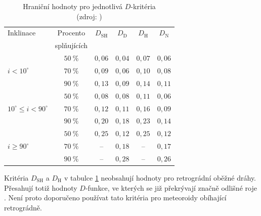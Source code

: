 \begin{table}[ht]
    \centering
    \caption[Hraniční hodnoty pro jednotlivá $D$-kritéria]{
        Hraniční hodnoty pro jednotlivá $D$-kritéria\\
        {\small (zdroj: \cite{galligan})}
    }
    \begin{tabular}{|l|c|c c c c|}
        \hline
        Inklinace                   & Procento    & $D_\text{SH}$ & $D_\text{D}$ & $D_\text{H}$ & $D_\text{N}$ \\
                                    & splňujících &               &              &              &              \\
        \hline
                                    & $50\:\%$    & $0{,}06$      & $0{,}04$     & $0{,}07$     & $0{,}06$     \\
        $i < 10^\circ$              & $70\:\%$    & $0{,}09$      & $0{,}06$     & $0{,}10$     & $0{,}08$     \\
                                    & $90\:\%$    & $0{,}13$      & $0{,}09$     & $0{,}14$     & $0{,}11$     \\
        \hline
                                    & $50\:\%$    & $0{,}08$      & $0{,}08$     & $0{,}11$     & $0{,}06$     \\
        $10^\circ \le i < 90^\circ$ & $70\:\%$    & $0{,}12$      & $0{,}11$     & $0{,}16$     & $0{,}09$     \\
                                    & $90\:\%$    & $0{,}20$      & $0{,}18$     & $0{,}23$     & $0{,}14$     \\
        \hline
                                    & $50\:\%$    & $0{,}25$      & $0{,}12$     & $0{,}25$     & $0{,}12$     \\
        $i \ge 90^\circ$            & $70\:\%$    & --            & $0{,}18$     & --           & $0{,}17$     \\
                                    & $90\:\%$    & --            & $0{,}28$     & --           & $0{,}26$     \\
        \hline
    \end{tabular}
    \label{tbl:performance:cutoffs}
\end{table}

Kritéria $D_\text{SH}$ a $D_\text{H}$ v tabulce \ref{tbl:performance:cutoffs} neobsahují hodnoty pro retrográdní oběžné dráhy. Přesahují totiž hodnoty $D$-funkce, ve kterých se již překrývají značně odlišné roje \cite{galligan}. Není proto doporučeno používat tato kritéria pro meteoroidy obíhající retrográdně.

